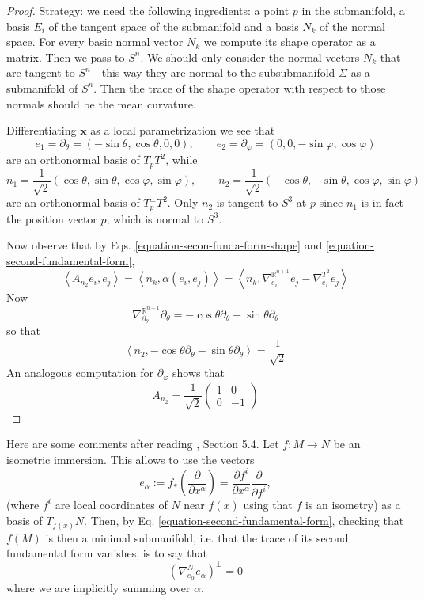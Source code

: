 \begin{proof}
Strategy: we need the following ingredients:
a point $p$ in the submanifold, a
basis $E_i$ of the tangent space of the
submanifold and a basis $N_k$ of the
normal space. For every basic normal vector
$N_k$ we compute its shape operator
as a matrix. Then we pass to $S^n$. We should
only consider the normal vectors
$N_k$ that are tangent to $S^n$---this way
they are normal to the subsubmanifold
$\Sigma$ as a submanifold of $S^n$. Then the
trace of the shape operator with
respect to those normals should be the mean
curvature.

Differentiating $\mathbf{x}$ as a local
parametrization we see that
$$
e_1=\partial_\theta=(-\sin\theta,\cos\theta,
0,0),\qquad
e_2=\partial_\varphi=(0,0,-\sin\varphi,
\cos\varphi)
$$
are an orthonormal basis of $T_pT^2$, while
$$
n_1=\frac{1}{\sqrt{2}}(\cos\theta,\sin\theta,
\cos\varphi,\sin\varphi),
\qquad
n_2=\frac{1}{\sqrt{2}}(-\cos\theta,-
\sin\theta,\cos\varphi,\sin\varphi)
$$
are an orthonormal basis of $T_p^\perp T^2$.
Only $n_2$ is tangent to $S^3$ at
$p$ since $n_1$ is in fact the position
vector $p$, which is normal to $S^3$.

Now observe that by Eqs.
\ref{equation-secon-funda-form-shape} and
\ref{equation-second-fundamental-form},
$$
\left\langle{}A_{n_2}e_i,e_j\right\rangle{}=\left\langle{}n_k,
\alpha(e_i,e_j)\right\rangle{}
=\left\langle{}n_k,\nabla^{\mathbb{R}^{n+1}}_{e_i}e_j
-\nabla^{T^2}_{e_i}e_j\right\rangle{}
$$
Now
$$
\nabla^{\mathbb{R}^{n+1}}_{\partial_\theta}
\partial_\theta=
-\cos\theta\partial_\theta-
\sin\theta\partial_\theta
$$
so that
$$
\left\langle{}n_2,-\cos\theta\partial_\theta-
\sin\theta\partial_\theta\right\rangle{}
=\frac{1}{\sqrt{2}}
$$
An analogous computation for
$\partial_\varphi$ shows that
$$
A_{n_2}=\frac{1}{\sqrt{2}}\begin{pmatrix}
1&0\\
0&-1
\end{pmatrix}
$$
\end{proof}

Here are some comments after reading
\cite{Jost}, Section 5.4. Let $f:M\to N$ be
an isometric immersion. This allows to use
the vectors
$$
e_\alpha:=f_*\left(\frac{\partial }{\partial
x^\alpha}\right)=
\frac{\partial f^i}{\partial
x^\alpha}\frac{\partial }{\partial f^i},
$$
(where $f^i$ are local coordinates of $N$
near $f(x)$ using that $f$ is an
isometry) as a basis of
$T_{f(x)}N$. Then, by Eq.
\ref{equation-second-fundamental-form},
checking that
$f(M)$ is then a minimal submanifold, i.e.
that the trace of its second
fundamental form vanishes, is to say that
\begin{equation}
\label{equation-isometric-immersion-basis}
(\nabla^{N}_{e_\alpha}e_\alpha)^\perp=0
\end{equation}
where we are implicitly summing over
$\alpha$.

